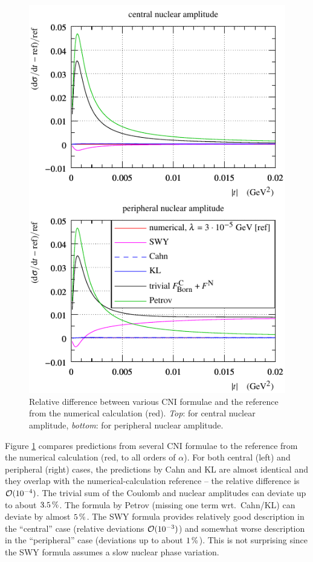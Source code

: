 \documentclass{appolb}
\def\un#1{\,{\rm #1}}
\begin{document}
\begin{figure}[h]
\begin{center}
\includegraphics{fig/cni_dsdt_cmp_formula.pdf}
\caption{Relative difference between various CNI formulae and the reference from the numerical calculation (red). {\it Top}: for central nuclear amplitude, {\it bottom}: for peripheral nuclear amplitude.}
\label{f:sig form}
\end{center}
\end{figure}

Figure \ref{f:sig form} compares predictions from several CNI formulae to the reference from the numerical calculation (red, to all orders of $\alpha$). For both central (left) and peripheral (right) cases, the predictions by Cahn and KL are almost identical and they overlap with the numerical-calculation reference -- the relative difference is ${\cal O}(10^{-4})$. The trivial sum of the Coulomb and nuclear amplitudes can deviate up to about $3.5\un{\%}$. The formula by Petrov (missing one term wrt.~Cahn/KL) can deviate by almost $5\un{\%}$. The SWY formula provides relatively good description in the ``central'' case (relative deviations ${\cal O}(10^{-3})$) and somewhat worse description in the ``peripheral'' case (deviations up to about $1\un{\%}$). This is not surprising since the SWY formula assumes a slow nuclear phase variation.
\end{document}
